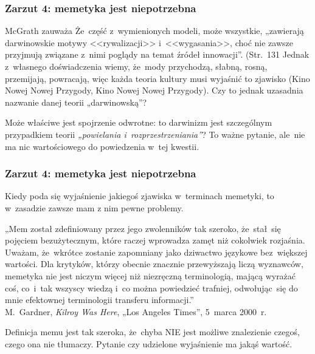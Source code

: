 \documentclass[10pt,t]{beamer}
\begin{document}
\begin{frame}
  \frametitle{Zarzut 4: memetyka jest niepotrzebna}


  McGrath zauważa Że~część z~wymienionych modeli, może wszystkie,
  „zawierają darwinowskie motywy <<rywalizacji>> i~<<wygasania>>, choć
  nie zawsze przyjmują związane z~nimi poglądy na temat źródeł
  innowacji”. (Str.~131 \cite{McGrathBogDawkinsa2008} Jednak z~własnego
  doświadczenia wiemy, że~mody przychodzą, słabną, rosną, przemijają,
  powracają, więc każda teoria kultury musi wyjaśnić to zjawisko (Kino Nowej
  Nowej Przygody, Kino Nowej Nowej Przygody). Czy to jednak uzasadnia
  nazwanie danej teorii „darwinowską”?


  Może właściwe jest spojrzenie odwrotne: to darwinizm jest szczególnym
  przypadkiem teorii \textit{„powielania i~rozprzestrzeniania”}? To ważne
  pytanie, ale~nie ma nic wartościowego do powiedzenia w~tej kwestii.

\end{frame}





\begin{frame}
  \frametitle{Zarzut 4: memetyka jest niepotrzebna}


  Kiedy poda się wyjaśnienie jakiegoś zjawiska w~terminach memetyki, to
  w~zasadzie zawsze mam z nim pewne problemy.

  „Mem został zdefiniowany przez jego zwolenników tak szeroko,
  że~stał~się pojęciem bezużytecznym, które raczej wprowadza zamęt
  niż cokolwiek rozjaśnia. Uważam, że~wkrótce zostanie zapomniany
  jako dziwactwo językowe bez~większej wartości. Dla krytyków,
  którzy obecnie znacznie przewyższają liczą wyznawców, memetyka nie
  jest niczym więcej niż niezręczną terminologią, mającą wyrażać
  coś, co~i~tak wszyscy wiedzą i~co można powiedzieć trafniej,
  odwołując~się do mnie efektownej terminologii transferu informacji.” \\
  M.~Gardner, \textit{Kilroy Was Here}, „Los Angeles Times”, 5~marca 2000~r.

  Definicja memu jest tak szeroka, że~chyba NIE jest możliwe
  znalezienie czegoś, czego ona nie tłumaczy. Pytanie czy udzielone
  wyjaśnienie ma jakąś wartość.

\end{frame}
\end{document}
